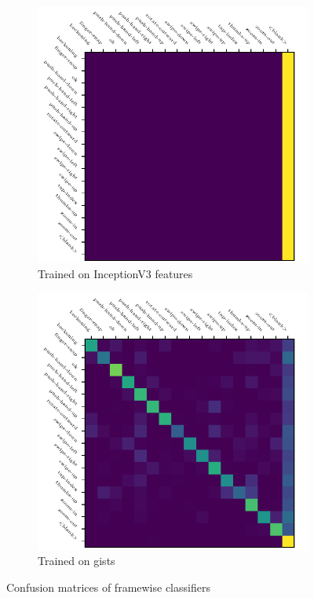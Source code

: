 \begin{figure}[h]
  \centering
  \begin{subfigure}{2.8in}
    \centering
    \includegraphics[width=\textwidth]{figures/results/confusion-matrices/ce/inceptionv3}
    \caption{Trained on InceptionV3 features}
    \label{fig:iv3-confusion}
  \end{subfigure}
  \hfill
  \begin{subfigure}{2.8in}
    \centering
    \includegraphics[width=\textwidth]{figures/results/confusion-matrices/ce/gists}
    \caption{Trained on gists}
    \label{fig:gists-confusion}
  \end{subfigure}
  \caption{Confusion matrices of framewise classifiers}
\end{figure}
